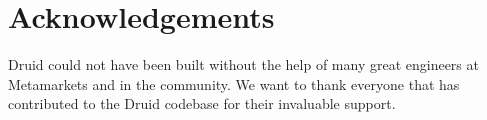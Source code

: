 \documentclass{acm_proc_article-sp}
\begin{document}
\balance

\section{Acknowledgements}
\label{sec:acknowledgements}
Druid could not have been built without the help of many great engineers at
Metamarkets and in the community.  We want to thank everyone that has
contributed to the Druid codebase for their invaluable support. 




\end{document}
